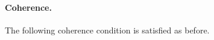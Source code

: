 \documentclass[preprint]{sigplanconf}
\begin{document}







\paragraph*{Coherence.}
The following coherence condition is satisfied as before.
\end{document}
